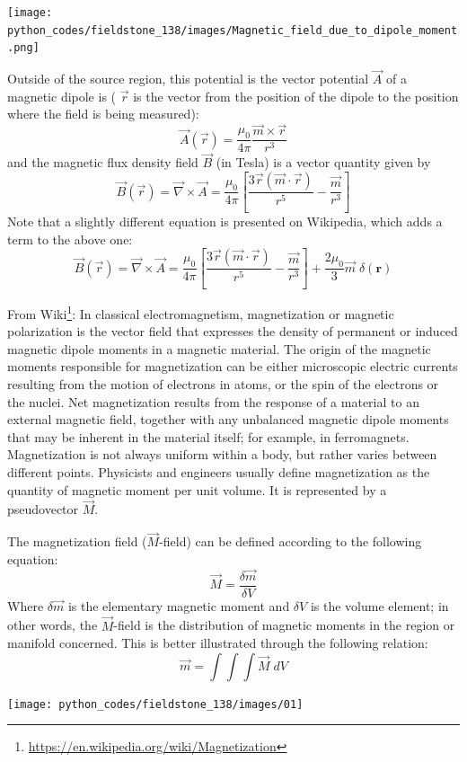 \begin{center}
\texttt{[image: python\_codes/fieldstone\_138/images/Magnetic\_field\_due\_to\_dipole\_moment.png]}
\end{center}

Outside of the source region, this potential is the vector potential $\vec A$ of a magnetic dipole is (
$\vec r$ is the vector from the position of the dipole to the position where the field is being measured):
\[
\vec A(\vec r) = \frac{\mu_0}{4 \pi} \frac{\vec m \times \vec r}{r^3}
\]
and the magnetic flux density field $\vec B$ (in Tesla) is a vector quantity given by
\[
\vec B (\vec r) = \vec \nabla \times \vec A 
=
\frac{\mu_0}{4\pi} \left[  \frac{3 \vec r (\vec m \cdot \vec r)}{r^5} - \frac{\vec m}{r^3}  \right]
\]
Note that a slightly different equation is presented on Wikipedia, which adds a term to the above one:
\[
\vec B (\vec r) = \vec \nabla \times \vec A 
=
\frac{\mu_0}{4\pi} \left[  \frac{3 \vec r (\vec m \cdot \vec r)}{r^5} - \frac{\vec m}{r^3}  \right]
+ \frac{2\mu_0}{3} \vec m \; \delta(\bm r)
\]

From Wiki\footnote{\url{https://en.wikipedia.org/wiki/Magnetization}}: In classical electromagnetism, magnetization or magnetic polarization is the vector field that expresses the density of permanent or induced magnetic dipole moments in a magnetic material. The origin of the magnetic moments responsible for magnetization can be either microscopic electric currents resulting from the motion of electrons in atoms, or the spin of the electrons or the nuclei. Net magnetization results from the response of a material to an external magnetic field, together with any unbalanced magnetic dipole moments that may be inherent in the material itself; for example, in ferromagnets. Magnetization is not always uniform within a body, but rather varies between different points. 
Physicists and engineers usually define magnetization as the quantity of magnetic moment per unit volume. It is represented by a pseudovector $\vec M$.

The magnetization field ($\vec M$-field) can be defined according to the following equation: 
\[
\vec M = \frac{\delta \vec m}{\delta V}
\]
Where $\delta \vec m$ is the elementary magnetic moment and $\delta V$  
is the volume element; in other words, the $\vec M$-field 
is the distribution of magnetic moments in the region or manifold concerned. 
This is better illustrated through the following relation:
\[
\vec m = \int\int\int \vec M \; dV
\]

\begin{center}
\texttt{[image: python\_codes/fieldstone\_138/images/01]}
\end{center}

